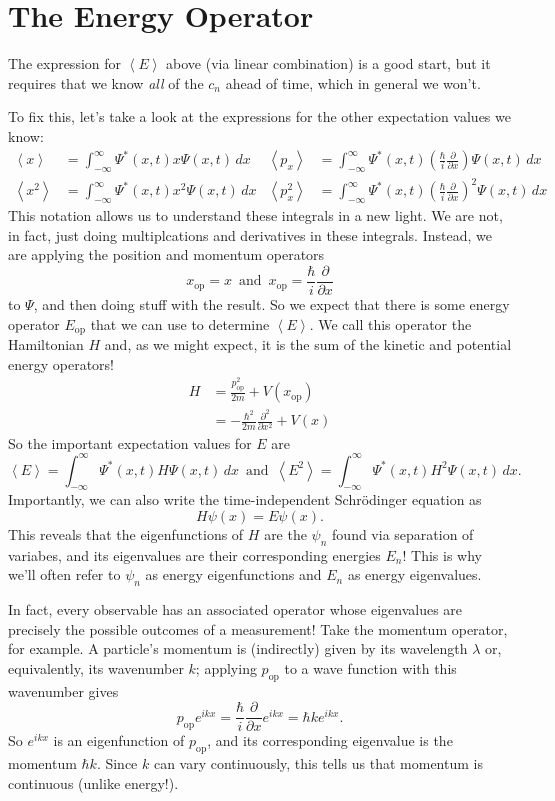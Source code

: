 \documentclass[../p052main.tex]{subfiles}
\begin{document}
\section{The Energy Operator}
The expression for $\left< E \right>$ above (via linear combination) is a good start, but it requires that we know \textit{all} of the $c_n$ ahead of time, which in general we won't.

To fix this, let's take a look at the expressions for the other expectation values we know:
\begin{align*}
    \left< x \right> &= \int_{-\infty}^{\infty} \Psi^*(x,t) x \Psi(x,t) \,dx & \left< p_x \right> &= \int_{-\infty}^{\infty} \Psi^*(x,t) \left( \frac{\hbar}{i} \frac{\partial}{\partial x} \right) \Psi(x,t) \,dx \\
    \left< x^2 \right> &= \int_{-\infty}^{\infty} \Psi^*(x,t) x^2 \Psi(x,t) \,dx & \left< p_x^2 \right> &= \int_{-\infty}^{\infty} \Psi^*(x,t) \left( \frac{\hbar}{i} \frac{\partial}{\partial x} \right)^2 \Psi(x,t) \,dx
\end{align*}
This notation allows us to understand these integrals in a new light.
We are not, in fact, just doing multiplcations and derivatives in these integrals.
Instead, we are applying the position and momentum operators
\[ x_\textrm{op} = x \,\text{ and }\, x_\textrm{op} = \frac{\hbar}{i} \frac{\partial}{\partial x} \]
to $\Psi$, and then doing stuff with the result.
So we expect that there is some energy operator $E_\textrm{op}$ that we can use to determine $\left< E \right>$.
We call this operator the Hamiltonian $H$ and, as we might expect, it is the sum of the kinetic and potential energy operators!
\begin{align*}
    H &= \frac{p_\textrm{op}^2}{2m} + V(x_\textrm{op}) \\
    &= -\frac{\hbar^2}{2m}\frac{\partial^2}{\partial x^2} + V(x)
\end{align*}
So the important expectation values for $E$ are
\[ \left< E \right> = \int_{-\infty}^{\infty} \Psi^*(x,t) H \Psi(x,t) \,dx \,\text{ and }\, \left< E^2 \right> = \int_{-\infty}^{\infty} \Psi^*(x,t) H^2 \Psi(x,t) \,dx. \]
Importantly, we can also write the time-independent Schrödinger equation as
\[ H \psi(x) = E \psi(x). \]
This reveals that the eigenfunctions of $H$ are the $\psi_n$ found via separation of variabes, and its eigenvalues are their corresponding energies $E_n$!
This is why we'll often refer to $\psi_n$ as energy eigenfunctions and $E_n$ as energy eigenvalues.

In fact, every observable has an associated operator whose eigenvalues are precisely the possible outcomes of a measurement!
Take the momentum operator, for example.
A particle's momentum is (indirectly) given by its wavelength $\lambda$ or, equivalently, its wavenumber $k$; applying $p_\textrm{op}$ to a wave function with this wavenumber gives
\[ p_\textrm{op} e^{ikx} = \frac{\hbar}{i} \frac{\partial}{\partial x} e^{ikx} = \hbar k e^{ikx}. \]
So $e^{ikx}$ is an eigenfunction of $p_\textrm{op}$, and its corresponding eigenvalue is the momentum $\hbar k$.
Since $k$ can vary continuously, this tells us that momentum is continuous (unlike energy!).
\end{document}

